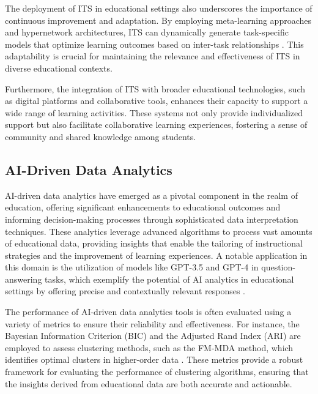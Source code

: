 The deployment of ITS in educational settings also underscores the importance of continuous improvement and adaptation. By employing meta-learning approaches and hypernetwork architectures, ITS can dynamically generate task-specific models that optimize learning outcomes based on inter-task relationships \cite{stank2024designingtimeseriesmodelshypernetworks}. This adaptability is crucial for maintaining the relevance and effectiveness of ITS in diverse educational contexts.



Furthermore, the integration of ITS with broader educational technologies, such as digital platforms and collaborative tools, enhances their capacity to support a wide range of learning activities. These systems not only provide individualized support but also facilitate collaborative learning experiences, fostering a sense of community and shared knowledge among students.






\subsection{AI-Driven Data Analytics} \label{subsec:AI-Driven Data Analytics}



AI-driven data analytics have emerged as a pivotal component in the realm of education, offering significant enhancements to educational outcomes and informing decision-making processes through sophisticated data interpretation techniques. These analytics leverage advanced algorithms to process vast amounts of educational data, providing insights that enable the tailoring of instructional strategies and the improvement of learning experiences. A notable application in this domain is the utilization of models like GPT-3.5 and GPT-4 in question-answering tasks, which exemplify the potential of AI analytics in educational settings by offering precise and contextually relevant responses \cite{oh2024generativeaiparadoxevaluation}.

The performance of AI-driven data analytics tools is often evaluated using a variety of metrics to ensure their reliability and effectiveness. For instance, the Bayesian Information Criterion (BIC) and the Adjusted Rand Index (ARI) are employed to assess clustering methods, such as the FM-MDA method, which identifies optimal clusters in higher-order data \cite{tait2020clusteringhigherorderdata}. These metrics provide a robust framework for evaluating the performance of clustering algorithms, ensuring that the insights derived from educational data are both accurate and actionable.

